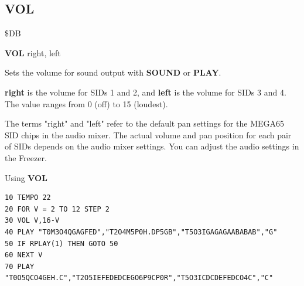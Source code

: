\subsection{VOL}
\begin{description}[leftmargin=2cm,style=nextline]
\item [Token:] \$DB
\item [Format:] {\bf VOL} right, left
\item [Usage:] Sets the volume for sound output with
               {\bf SOUND} or {\bf PLAY}.

               {\bf right} is the volume for SIDs 1 and 2, and {\bf left} is
               the volume for SIDs 3 and 4. The value ranges from 0 (off) to
               15 (loudest).

\item [Remarks:]
               The terms "right" and "left" refer to the default pan settings
               for the MEGA65 SID chips in the audio mixer. The actual volume
               and pan position for each pair of SIDs depends on the audio
               mixer settings. You can adjust the audio settings in the
               Freezer.

\item [Example:] Using {\bf VOL}
\begin{tcolorbox}[colback=black,coltext=white]
\verbatimfont{\codefont}
\begin{verbatim}
10 TEMPO 22
20 FOR V = 2 TO 12 STEP 2
30 VOL V,16-V
40 PLAY "T0M3O4QGAGFED","T2O4M5P0H.DP5GB","T5O3IGAGAGAABABAB","G"
50 IF RPLAY(1) THEN GOTO 50
60 NEXT V
70 PLAY "T0O5QCO4GEH.C","T2O5IEFEDEDCEGO6P9CP0R","T5O3ICDCDEFEDCO4C","C"
\end{verbatim}
\end{tcolorbox}
\end{description}


\newpage

